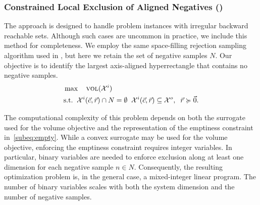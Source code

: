\documentclass[letterpaper, 10 pt, conference]{ieeeconf}  %
\begin{document}
\subsubsection{Constrained Local Exclusion of Aligned Negatives (\clean)}
The \clean approach is designed to handle problem instances with irregular backward reachable sets. Although such cases are uncommon in practice, we include this method for completeness. We employ the same space-filling rejection sampling algorithm used in \crisp, but here we retain the set of negative samples $N$. Our objective is to identify the largest axis-aligned hyperrectangle that contains no negative samples.
\begin{subequations}
\begin{align}
&\max \quad \textsc{vol}(\mathcal{X}^i) \\
&\text{s.t.}\;\;
\mathcal{X}^i(\vec{c},\vec{r}) \cap N = \emptyset\;\;
 \mathcal{X}^i(\vec{c},\vec{r}) \subseteq \mathcal{X}^o, \;\;
\vec{r} \succcurlyeq \vec{0}. \label{subeq:empty}
\end{align}
\label{eq:bw_reach_clean}
\end{subequations}

\vspace*{-1em}
\noindent
The computational complexity of this problem depends on both the surrogate used for the volume objective and the representation of the emptiness constraint in~\cref{subeq:empty}. While a convex surrogate may be used for the volume objective, enforcing the emptiness constraint requires integer variables. In particular, binary variables are needed to enforce exclusion along at least one dimension for each negative sample $n \in N$. Consequently, the resulting optimization problem is, in the general case, a mixed-integer linear program. The number of binary variables scales with both the system dimension and the number of negative samples.
\end{document}
